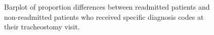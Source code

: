 \documentclass[sn-basic,pdflatex]{sn-jnl}
\theoremstyle{remark}
\theoremstyle{definition}
\begin{document}
\begin{appendices}
\begin{figure}[H]
{}

\caption{Barplot of proportion differences between readmitted patients and non-readmitted patients who received specific diagnosis codes at their tracheostomy visit.}\label{fig:diffs}
\end{figure}

\end{appendices}
\end{document}
